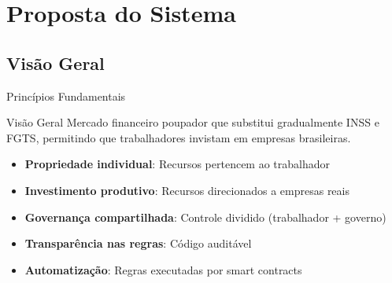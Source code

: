 \documentclass{libs/ufc_format}
\begin{document}
\section{Proposta do Sistema}

\subsection{Visão Geral}
\begin{frame}{Princípios Fundamentais}
    \begin{exampleblock}{Visão Geral}
        Mercado financeiro poupador que substitui gradualmente INSS e FGTS, permitindo que trabalhadores invistam em empresas brasileiras.
    \end{exampleblock}
    
    \vspace{0.3cm}
    
    \begin{itemize}
        \item \textbf{Propriedade individual}: Recursos pertencem ao trabalhador
        \item \textbf{Investimento produtivo}: Recursos direcionados a empresas reais
        \item \textbf{Governança compartilhada}: Controle dividido (trabalhador + governo)
        \item \textbf{Transparência nas regras}: Código auditável
        \item \textbf{Automatização}: Regras executadas por smart contracts
    \end{itemize}
\end{frame}

\end{document}
